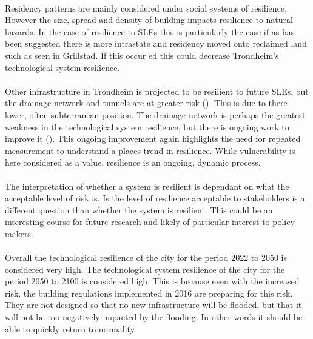 \paragraph{}
Residency patterns are mainly considered under social systems of resilience. However the size, spread and density of building impacts resilience to natural hazards. In the case of resilience to SLEs this is particularly the case if as has been suggested there is more intrastate and residency moved onto reclaimed land such as seen in Grillstad. If this occur ed this could decrease Trondheim's technological system resilience.
\paragraph{}
Other infrastructure in Trondheim is projected to be resilient to future SLEs, but the drainage network and tunnels are at greater risk (\cite{hanssen_saksframlegg_2013}). This is due to there lower, often subterranean position. The drainage network is perhaps the greatest weakness in the technological system resilience, but there is ongoing work to improve it (\cite{hanssen_saksframlegg_2013}). This ongoing improvement again highlights the need for repeated measurement to understand a places trend in resilience. While vulnerability is here considered as a value, resilience is an ongoing, dynamic process.
\paragraph{}
The interpretation of whether a system is resilient is dependant on what the acceptable level of risk is. Is the level of resilience acceptable to stakeholders is a different question than whether the system is resilient. This could be an interesting course for future research and likely of particular interest to policy makers.
\paragraph{}
Overall the technological resilience of the city for the period 2022 to 2050 is considered very high. The technological system resilience of the city for the period 2050 to 2100 is considered high. This is because even with the increased risk, the building regulations implemented in 2016 are preparing for this risk. They are not designed so that no new infrastructure will be flooded, but that it will not be too negatively impacted by the flooding. In other words it should be able to quickly return to normality. 


